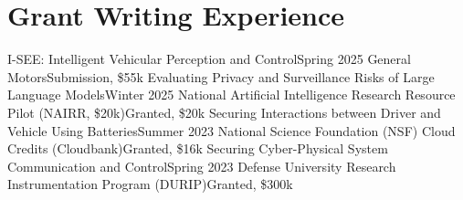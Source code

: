 \section{Grant Writing Experience}
  \CVSubHeadingListStart
    \CVSubheading
      {I-SEE: Intelligent Vehicular Perception and Control}{Spring 2025}
      {General Motors}{Submission, \$55k}
    \CVSubheading
      {Evaluating Privacy and Surveillance Risks of Large Language Models}{Winter 2025}
      {National Artificial Intelligence Research Resource Pilot (NAIRR, \$20k)}{Granted, \$20k}
    \CVSubheading
      {Securing Interactions between Driver and Vehicle Using Batteries}{Summer 2023}
      {National Science Foundation (NSF) Cloud Credits (Cloudbank)}{Granted, \$16k}
    \CVSubheading
      {Securing Cyber-Physical System Communication and Control}{Spring 2023}
      {Defense University Research Instrumentation Program (DURIP)}{Granted, \$300k}
  \CVSubHeadingListEnd